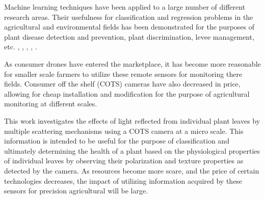 Machine learning techniques have been applied to a large number of different research areas.  Their usefulness for classification and regression problems in the agricultural and environmental fields has been demonstrated for the purposes of plant disease detection and prevention, plant discrimination, levee management, etc. \cite{mississippi}, \cite{plantdiscrimination}, \cite{plantvirus}, \cite{recognitionplants}, \cite{laserplants}.

As consumer drones have entered the marketplace, it has become more reasonable for smaller scale farmers to utilize these remote sensors for monitoring there fields.  Consumer off the shelf (COTS) cameras have also decreased in price, allowing for cheap installation and modification for the purpose of agricultural monitoring at different scales.

This work investigates the effects of light reflected from individual plant leaves by multiple scattering mechanisms using a COTS camera at a micro scale.  This information is intended to be useful for the purpose of classification and ultimately determining the health of a plant based on the physiological properties of individual leaves by observing their polarization and texture properties as detected by the camera.  As resources become more scare, and the price of certain technologies decreases, the impact of utilizing information acquired by these sensors for precision agricultural will be large.
